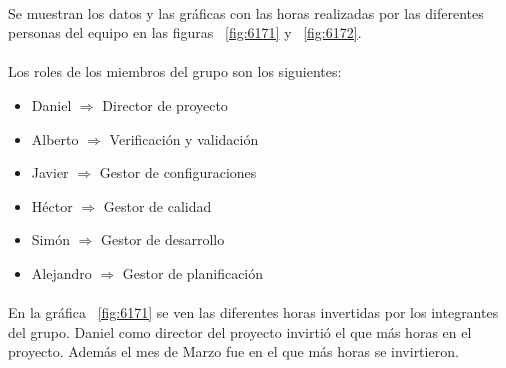 
\paragraph{} Se muestran los datos y las gráficas con las horas realizadas por las diferentes personas del equipo en las figuras ~\cref{fig:6171} y ~\cref{fig:6172}. 

\paragraph{} Los roles de los miembros del grupo son los siguientes:
\begin{itemize}
\item Daniel $\Rightarrow$ Director de proyecto
\item Alberto $\Rightarrow$ Verificación y validación
\item Javier $\Rightarrow$ Gestor de configuraciones
\item Héctor $\Rightarrow$ Gestor de calidad
\item Simón $\Rightarrow$ Gestor de desarrollo
\item Alejandro $\Rightarrow$ Gestor de planificación
\end{itemize}

\paragraph{} En la gráfica ~\cref{fig:6171} se ven las diferentes horas invertidas por los integrantes del grupo. Daniel como director del proyecto invirtió el que más horas en el proyecto. Además el mes de Marzo fue en el que más horas se invirtieron.


